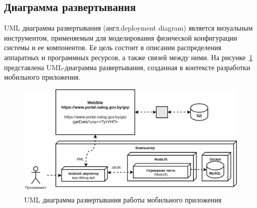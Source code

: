 \subsection{Диаграмма развертывания}

UML диаграмма развертывания (англ.deployment diagram) является визуальным инструментом,
применяемым для моделирования физической конфигурации системы и ее компонентов.
Ее цель состоит в описании распределения аппаратных и программных ресурсов,
а также связей между ними.
На рисунке~\ref{fig:db_UML_deployment_mobile} представлена UML-диаграмма развертывания,
созданная в контексте разработки мобильного приложения.




\begin{figure}[!h]
    \centering

    \includegraphics[width=14cm]
    {images/UML/deployment/mobile.png}

    \caption{UML диаграмма развертывания работы мобильного приложения}

    \label{fig:db_UML_deployment_mobile}
\end{figure}


